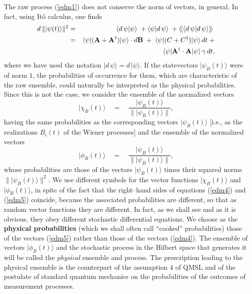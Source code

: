 \documentclass[10pt,a4paper]{article}
\newcommand{\llangle}{\langle\!\langle}
\newcommand{\rrangle}{\rangle\!\rangle}
\begin{document}
The raw process (\ref{edm1}) does not conserve the norm of
vectors, in general. In fact, using It\^o calculus, one finds
\begin{eqnarray} \label{edm7}
d\, \| |\psi(t)\rangle\|^{2} & = & \langle d\,\psi |\psi\rangle \;
+ \langle \psi |d\,\psi\rangle \; + \llangle \langle d\,\psi
|d\,\psi\rangle\rrangle \;
\nonumber \\
& = & \langle\psi |({\bf A} + {\bf A}^{\dagger}) | \psi\rangle
\cdot d{\bf B} \; + \; \langle\psi| (C + C^{\dagger})
|\psi\rangle\, dt \; + \nonumber \\
& & \langle\psi | {\bf A}^{\dagger} \cdot{\bf A} | \psi\rangle \,
\gamma\, dt,
\end{eqnarray}
where we have used the notation $|d\,\psi\rangle =
d\,|\psi\rangle$. If the statevectors $|\psi_{B}(t)\rangle$ were
of norm $1$, the probabilities of occurrence for them, which are
characteristic of the raw ensemble, could naturally be interpreted
as the physical probabilities. Since this is not the case, we
consider the ensemble of the normalized vectors
\begin{equation} \label{edm4}
|\chi_{B}(t)\rangle \quad = \quad \frac{|\psi_{B}(t)\rangle}{\|
|\psi_{B}(t)\rangle\|},
\end{equation}
having the same probabilities as the corresponding vectors
$|\psi_{B}(t)\rangle$ [i.e., as the realizations $B_{i}(t)$ of the
Wiener processes] and the ensemble of the normalized vectors
\begin{equation} \label{edm5}
|\phi_{B}(t)\rangle \quad = \quad \frac{|\psi_{B}(t)\rangle}{\|
|\psi_{B}(t)\rangle\|},
\end{equation}
whose probabilities are those of the vectors $|\psi_{B}(t)\rangle$
times their squared norms $\| |\psi_{B}(t)\rangle\|^{2}$. We use
different symbols for the vector functions $|\chi_{B}(t)\rangle$
and $|\phi_{B}(t)\rangle$, in spite of the fact that the
right--hand sides of equations (\ref{edm4}) and (\ref{edm5})
coincide, because the associated probabilities are different, so
that as random vector functions they are different. In fact, as we
shall see and as it is obvious, they obey different stochastic
differential equations. We choose as the {\bf physical
probabilities} (which we shall often call ``cooked''
probabilities) those of the vectors (\ref{edm5}) rather than those
of the vectors (\ref{edm4}). The ensemble of vectors
$|\phi_{B}(t)\rangle$ and the stochastic process in the Hilbert
space that generates it will be called the {\it physical} ensemble
and process. The prescription leading to the physical ensemble is
the counterpart of the assumption $4$ of QMSL and of the postulate
of standard quantum mechanics on the probabilities of the outcomes
of measurement processes.
\end{document}
